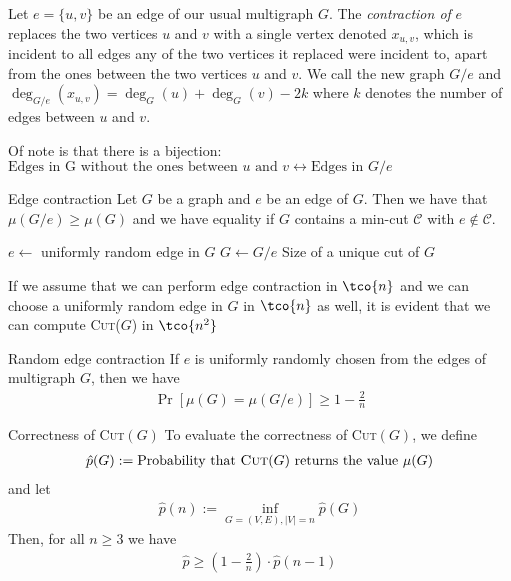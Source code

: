 Let $e = \{u, v\}$ be an edge of our usual multigraph $G$.
The \textit{contraction of} $e$ replaces the two vertices $u$ and $v$ with a single vertex denoted $x_{u, v}$, which is incident to all edges any of the two vertices it replaced were incident to, apart from the ones between the two vertices $u$ and $v$.
We call the new graph $G/e$ and $\deg_{G/e}(x_{u, v}) = \deg_G(u) + \deg_G(v) - 2k$ where $k$ denotes the number of edges between $u$ and $v$.

Of note is that there is a bijection: $\text{Edges in G without the ones between $u$ and } v \leftrightarrow \text{Edges in $G/e$}$

\begin{lemma}[]{Edge contraction}
    Let $G$ be a graph and $e$ be an edge of $G$. Then we have that $\mu(G/e) \geq \mu(G)$ and we have equality if $G$ contains a min-cut $\mathcal{C}$ with $e \notin \mathcal{C}$.
\end{lemma}



\begin{algorithm}
    \caption{Random Cut where $G$ is a connected Multigraph}
    \begin{algorithmic}[1]
             
                \State $e \gets$ uniformly random edge in $G$
                \State $G \gets G/e$
            \EndWhile
            \State \Return Size of a unique cut of $G$
        \EndProcedure
    \end{algorithmic}
\end{algorithm}

If we assume that we can perform edge contraction in $\tco{n}$ and we can choose a uniformly random edge in $G$ in $\tco{n}$ as well, it is evident that we can compute \textsc{Cut}($G$) in $\tco{n^2}$

\begin{lemma}[]{Random edge contraction}
    If $e$ is uniformly randomly chosen from the edges of multigraph $G$, then we have
    \begin{align*}
        \Pr[\mu(G) = \mu(G/e)] \geq 1 - \frac{2}{n}
    \end{align*}
\end{lemma}

\newpage
\begin{lemma}[]{Correctness of \textsc{Cut}$(G)$}
    To evaluate the correctness of \textsc{Cut}$(G)$, we define
    \begin{align*}
        \hat{p}(G) := \text{Probability that \textsc{Cut}($G$) returns the value } \mu(G)
    \end{align*}
    and let
    \begin{align*}
        \hat{p}(n) := \inf_{G=(V, E), |V| = n}\hat{p}(G)
    \end{align*}
    Then, for all $n \geq 3$ we have
    \begin{align*}
        \hat{p} \geq \left( 1 - \frac{2}{n} \right) \cdot \hat{p}(n - 1)
    \end{align*}
\end{lemma}

